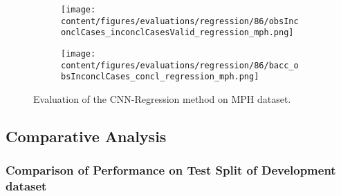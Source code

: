 

\begin{figure}[t]
  \begin{subfigure}{0.9\textwidth}
    \centering
    \texttt{[image: content/figures/evaluations/regression/86/obsInconclCases\_inconclCasesValid\_regression\_mph.png]}
    \label{fig:obsInconclCases_inconclCasesValid_regression_mph}
  \end{subfigure}
  \hfill
  \begin{subfigure}{0.9\textwidth}
    \centering
    \texttt{[image: content/figures/evaluations/regression/86/bacc\_obsInconclCases\_concl\_regression\_mph.png]}
    \label{fig:bacc_obsInconclCases_concl_regression_mph}
  \end{subfigure}
  \caption{Evaluation of the CNN-Regression method on MPH dataset.}
\end{figure}


\subsection{Comparative Analysis}
\label{subsec:compar_anal}


\subsubsection{Comparison of Performance on Test Split of Development dataset}
\label{subsubsec:perf_comp_dev}


